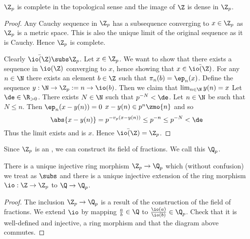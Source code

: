 \begin{prop}
    $\Z_p$ is complete in the topological sense
    and the image of $\Z$ is dense in $\Z_p$.
\end{prop}
\begin{proof}
    Any Cauchy sequence in $\Z_p$ has a
    subsequence converging to $x \in \Z_p$
    as $\Z_p$ is a  metric space.
    This is also the unique limit of the original sequence 
    as it is Cauchy.
    Hence $\Z_p$ is complete.

    Clearly $\bar{\io(\Z)} \subs \Z_p$.
    Let $x \in \Z_p$. 
    We want to show that there exists a sequence
    in $\io(\Z)$ converging to $x$, 
    hence showing that $x \in \bar{\io(\Z)}$.
    For any $n \in \N$ there exists an element 
    $b \in \Z$ such that $\pi_n(b) = \ep_n(x)$.
    Define the sequence $y: \N \to \Z_p := n \to \io(b)$.
    Then we claim that $\lim_{n \in \N} y(n) = x$
    Let $\de \in \R_{>0}$. 
    There exists $N \in \N$ such that $p^{-N}<\de$.
    Let $n \in \N$ be such that $N \le n$.
    Then $\ep_n(x - y(n)) = 0$ 
    $x - y(n) \in p^n \zmo{n}$  
    and so 
    \[\abs{x - y(n)} = p^{-v_p(x - y(n))} \le p^{-n}
    \le p^{-N} < \de\]
    Thus the limit exists and is $x$.
    Hence $\bar{\io(\Z)} = \Z_p$.
\end{proof}

\begin{dfn}[$\Q_p$]
    Since $\Z_p$ is an 
    ,
    we can construct its field of fractions.
    We call this $\Q_p$.
\end{dfn}

\begin{prop}
    There is a unique injective ring morphism $\Z_p \to \Q_p$
    which (without confusion) we treat as $\subs$
    and there is a unique injective extension of the ring morphism 
    $\io : \Z \to \Z_p$ to $\Q \to \Q_p$.
    \begin{center}
    \end{center}
\end{prop}
\begin{proof}
    The inclusion $\Z_p \to \Q_p$ is a result
    of the construction of the field of fractions.
    We extend $\io$ by mapping $\frac{a}{b} \in \Q$ to
    $\frac{\io(a)}{\io(b)} \in \Q_p$.
    Check that it is well-defined and injective,
    a ring morphism and that the diagram above commutes.
\end{proof}


